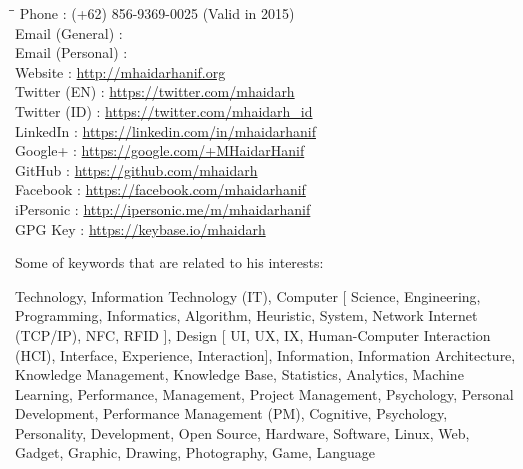 \begin{tabbing}
\hspace*{3cm}\=\hspace*{0.5cm}\= \kill
Phone \>:\> (+62) 856-9369-0025 (Valid in 2015) \\
Email (General) \>:\> \myEmailGeneral \\
Email (Personal) \>:\> \myEmailPersonal \\
Website \>:\> \url{http://mhaidarhanif.org} \\
Twitter (EN) \>:\> \url{https://twitter.com/mhaidarh} \\
Twitter (ID) \>:\> \url{https://twitter.com/mhaidarh_id} \\
LinkedIn \>:\> \url{https://linkedin.com/in/mhaidarhanif} \\
Google+ \>:\> \url{https://google.com/+MHaidarHanif} \\
GitHub \>:\> \url{https://github.com/mhaidarh} \\
Facebook \>:\> \url{https://facebook.com/mhaidarhanif} \\
iPersonic \>:\> \url{http://ipersonic.me/m/mhaidarhanif} \\
GPG Key \>:\> \url{https://keybase.io/mhaidarh}
\end{tabbing}

\noindent Some of keywords that are related to his interests:

Technology, Information Technology (IT), Computer [ Science, Engineering, Programming, Informatics, Algorithm, Heuristic, System, Network {Internet (TCP/IP), NFC, RFID} ], Design [ UI, UX, IX, Human-Computer Interaction (HCI), Interface, Experience, Interaction], Information, Information Architecture, Knowledge Management, Knowledge Base, Statistics, Analytics, Machine Learning, Performance, Management, Project Management, Psychology, Personal Development, Performance Management (PM), Cognitive, Psychology, Personality, Development, Open Source, Hardware, Software, Linux, Web, Gadget, Graphic, Drawing, Photography, Game, Language

